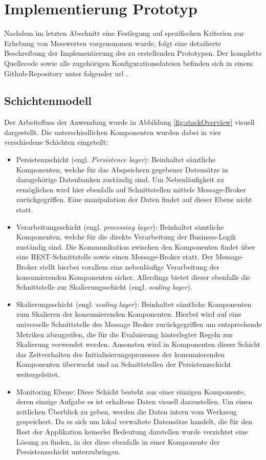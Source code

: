 \section{Implementierung Prototyp}

Nachdem im letzten Abschnitt eine Festlegung auf spezifischen Kriterien zur Erhebung von Messwerten vorgenommen wurde, folgt eine detailierte Beschreibung der Implementierung des zu erstellenden Prototypen. Der komplette Quellecode sowie alle zugehörigen Konfigurationsdateien befinden sich in einem Github-Repository unter folgender url \url{} .

\subsection{Schichtenmodell}
Der Arbeitsfluss der Anwendung wurde in Abbildung \ref{fig:stackOverview} visuell dargestellt. Die unterschiedlichen Komponenten wurden dabei in vier verschiedene Schichten eingeteilt: 

\begin{itemize}
  \item Persistenzschicht (engl. \emph{Persistence layer}): Beinhaltet sämtliche Komponenten, welche für das Abspeichern gegebener Datensätze in dazugehörige Datenbanken zuständig sind. Um Nebenläufigkeit zu ermöglichen wird hier ebenfalls auf Schnittstellen mittels Message-Broker zurückgegriffen. Eine manipulation der Daten findet auf dieser Ebene nicht statt.
  \item Verarbeitungsschicht (engl. \emph{processing layer}): Beinhaltet sämtliche Komponenten, welche für die direkte Verarbeitung der Business-Logik zuständig sind. Die Kommunikation zwischen den Komponenten findet über eine REST-Schnittstelle sowie einen Message-Broker statt. Der Message-Broker stellt hierbei vorallem eine nebenläufige Verarbeitung der konsumierenden Komponenten sicher. Allerdings bietet dieser ebenfalls die Schnittstelle zur Skalierungsschicht (engl. \emph{scaling layer}).
  \item Skalierungsschicht (engl. \emph{scaling layer}): Beinhaltet sämtliche Komponenten zum Skalieren der konsumierenden Komponenten. Hierbei wird auf eine universelle Schnittstelle des Message Broker zurückgegriffen um entsprechende Metriken abzugreifen, die für die Evaluierung hinterlegter Regeln zur Skalierung verwendet werden. Ansonsten wird in Komponenten dieser Schicht das Zeitverhalten des Initialisierungsprozesses der konsumierenden Komponenten überwacht und an Schnittstellen der Persistenzschicht weitergeleitet.
  \item Monitoring Ebene: Diese Schicht besteht aus einer einzigen Komponente, deren einzige Aufgabe es ist erhaltene Daten visuell darzustellen. Um einen zeitlichen Überblick zu geben, werden die Daten intern vom Werkzeug gespeichert. Da es sich um lokal verwaltete Datensätze handelt, die für den Rest der Applikation keinerlei Bedeutung darstellen wurde verzichtet eine Lösung zu finden, in der diese ebenfalls in einer Komponente der Persistenzschicht unterzubringen.
\end{itemize}

